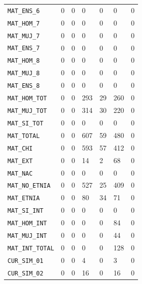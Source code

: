 \documentclass[10pt]{article}
\begin{document}
\begin{xltabular}{\linewidth}{@{}p{4.3cm} Y Y Y Y Y Y @{}}
\texttt{MAT\_\allowbreak{}ENS\_\allowbreak{}6} & 0 & 0 & 0 & 0 & 0 & 0 \\
\texttt{MAT\_\allowbreak{}HOM\_\allowbreak{}7} & 0 & 0 & 0 & 0 & 0 & 0 \\
\texttt{MAT\_\allowbreak{}MUJ\_\allowbreak{}7} & 0 & 0 & 0 & 0 & 0 & 0 \\
\texttt{MAT\_\allowbreak{}ENS\_\allowbreak{}7} & 0 & 0 & 0 & 0 & 0 & 0 \\
\texttt{MAT\_\allowbreak{}HOM\_\allowbreak{}8} & 0 & 0 & 0 & 0 & 0 & 0 \\
\texttt{MAT\_\allowbreak{}MUJ\_\allowbreak{}8} & 0 & 0 & 0 & 0 & 0 & 0 \\
\texttt{MAT\_\allowbreak{}ENS\_\allowbreak{}8} & 0 & 0 & 0 & 0 & 0 & 0 \\
\texttt{MAT\_\allowbreak{}HOM\_\allowbreak{}TOT} & 0 & 0 & 293 & 29 & 260 & 0 \\
\texttt{MAT\_\allowbreak{}MUJ\_\allowbreak{}TOT} & 0 & 0 & 314 & 30 & 220 & 0 \\
\texttt{MAT\_\allowbreak{}SI\_\allowbreak{}TOT} & 0 & 0 & 0 & 0 & 0 & 0 \\
\texttt{MAT\_\allowbreak{}TOTAL} & 0 & 0 & 607 & 59 & 480 & 0 \\
\texttt{MAT\_\allowbreak{}CHI} & 0 & 0 & 593 & 57 & 412 & 0 \\
\texttt{MAT\_\allowbreak{}EXT} & 0 & 0 & 14 & 2 & 68 & 0 \\
\texttt{MAT\_\allowbreak{}NAC} & 0 & 0 & 0 & 0 & 0 & 0 \\
\texttt{MAT\_\allowbreak{}NO\_\allowbreak{}ETNIA} & 0 & 0 & 527 & 25 & 409 & 0 \\
\texttt{MAT\_\allowbreak{}ETNIA} & 0 & 0 & 80 & 34 & 71 & 0 \\
\texttt{MAT\_\allowbreak{}SI\_\allowbreak{}INT} & 0 & 0 & 0 & 0 & 0 & 0 \\
\texttt{MAT\_\allowbreak{}HOM\_\allowbreak{}INT} & 0 & 0 & 0 & 0 & 84 & 0 \\
\texttt{MAT\_\allowbreak{}MUJ\_\allowbreak{}INT} & 0 & 0 & 0 & 0 & 44 & 0 \\
\texttt{MAT\_\allowbreak{}INT\_\allowbreak{}TOTAL} & 0 & 0 & 0 & 0 & 128 & 0 \\
\texttt{CUR\_\allowbreak{}SIM\_\allowbreak{}01} & 0 & 0 & 4 & 0 & 3 & 0 \\
\texttt{CUR\_\allowbreak{}SIM\_\allowbreak{}02} & 0 & 0 & 16 & 0 & 16 & 0 \\

\end{xltabular}
\end{document}
